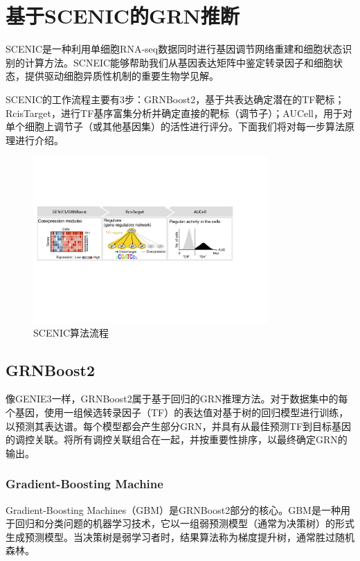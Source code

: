 
\chapter{基于SCENIC的GRN推断}
  SCENIC是一种利用单细胞RNA-seq数据同时进行基因调节网络重建和细胞状态识别的计算方法。SCNEIC能够帮助我们从基因表达矩阵中鉴定转录因子和细胞状态，提供驱动细胞异质性机制的重要生物学见解。

  SCENIC的工作流程主要有3步：GRNBoost2，基于共表达确定潜在的TF靶标；RcisTarget，进行TF基序富集分析并确定直接的靶标（调节子）；AUCell，用于对单个细胞上调节子（或其他基因集）的活性进行评分。下面我们将对每一步算法原理进行介绍。

\begin{figure}[!htb]
  \centering
  \includegraphics[width=0.8\textwidth]{figs/scenic-workflow.pdf}
  \caption{SCENIC算法流程}
  \label{fig:scenic-workflow}
\end{figure}

\section{GRNBoost2}
  像GENIE3\cite{huynh2010inferring}一样，GRNBoost2属于基于回归的GRN推理方法\cite{sanguinetti2019gene}。对于数据集中的每个基因，使用一组候选转录因子（TF）的表达值对基于树的回归模型进行训练，以预测其表达谱。每个模型都会产生部分GRN，并具有从最佳预测TF到目标基因的调控关联。将所有调控关联组合在一起，并按重要性排序，以最终确定GRN的输出。

\subsection{Gradient-Boosting Machine}
  Gradient-Boosting Machines（GBM）\cite{friedman2001greedy}是GRNBoost2\cite{moerman2019grnboost2}部分的核心。GBM是一种用于回归和分类问题的机器学习技术，它以一组弱预测模型（通常为决策树）的形式生成预测模型。当决策树是弱学习者时，结果算法称为梯度提升树，通常胜过随机森林。

